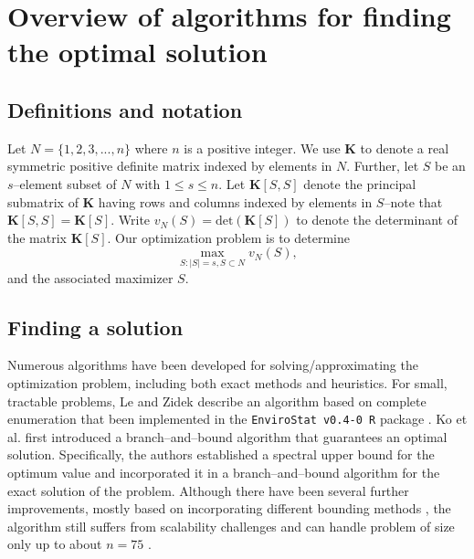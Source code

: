 \documentclass[]{interact}
\theoremstyle{plain}%
\theoremstyle{definition}
\theoremstyle{remark}
\newcommand{\matr}[1]{\bm{#1}}
\begin{document}
\section{Overview of algorithms for finding the optimal solution}\label{overview}

\subsection{Definitions and notation}
Let $N = \{1, 2, 3, ..., n\}$ where $n$ is a positive integer. We use $\matr{K}$ to denote a real symmetric positive definite matrix indexed by elements in $N$. Further, let $S$ be an $s$--element subset of $N$ with $1 \leq s \leq n$. Let $\matr{K}[S, S]$ denote the principal submatrix of $\matr{K}$ having rows and columns indexed by elements in $S$--note that $\matr{K}[S, S] = \matr{K}[S]$. Write $v_{N} (S) = \text{det}(\matr{K}[S])$ to denote the determinant of the matrix $\matr{K}[S]$. Our optimization problem is to determine
\begin{equation}\label{P}
	\max_{{S}: |S|=s, S \subset N} v_{N} (S),
\end{equation} and the associated maximizer $S$. 

\subsection{Finding a solution}
Numerous algorithms have been developed for solving/approximating the optimization problem, including both exact methods and heuristics. For small, tractable problems, Le and Zidek \cite{LeZidek} describe an algorithm based on complete enumeration that been implemented in the \texttt{EnviroStat v0.4-0 R} package \cite{Le2014}. Ko et al. \cite{KO1995} first introduced a branch--and--bound algorithm that guarantees an optimal solution. Specifically, the authors established a spectral upper bound for the optimum value and incorporated it in a branch--and--bound algorithm for the exact solution of the problem. Although there have been several further improvements, mostly based on incorporating different bounding methods \cite{Anstreicher1996,Anstreicher1999,Hoffman2001,Lee2000,LeeWilliams}, the algorithm still suffers from scalability challenges and can handle problem of size only up to about $n = 75$ \cite{Lee2001}.    
\end{document}
